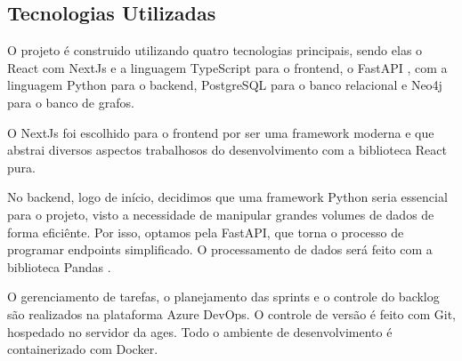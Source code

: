 \subsection{Tecnologias Utilizadas}
  O projeto é construido utilizando quatro tecnologias principais, sendo elas o React \cite{react} com NextJs \cite{nextjs} e a linguagem TypeScript \cite{typescript} para o frontend, o FastAPI \cite{fastapi}, com a linguagem Python para o backend, PostgreSQL para o banco relacional e Neo4j \cite{neo4j} para o banco de grafos.
  
  O NextJs foi escolhido para o frontend por ser uma framework moderna e que abstrai diversos aspectos trabalhosos do desenvolvimento com a biblioteca React pura.

  No backend, logo de início, decidimos que uma framework Python seria essencial para o projeto, visto a necessidade de manipular grandes volumes de dados de forma eficiênte. Por isso, optamos pela FastAPI, que torna o processo de programar endpoints simplificado. O processamento de dados será feito com a biblioteca Pandas \cite{pandas}.

  O gerenciamento de tarefas, o planejamento das sprints e o controle do backlog são realizados na plataforma Azure DevOps. O controle de versão é feito com Git, hospedado no servidor da \acs{ages}. Todo o ambiente de desenvolvimento é containerizado com Docker.